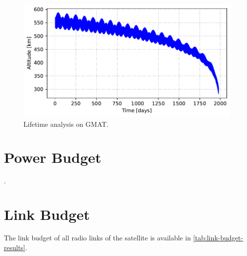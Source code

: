 \begin{figure}[!ht]
    \begin{center}
        \includegraphics[width=\textwidth]{curves/lifetime.pdf}
        \caption{Lifetime analysis on GMAT.}
        \label{fig:lifetime-analysis}
    \end{center}
\end{figure}

\section{Power Budget}

.

\section{Link Budget}

The link budget of all radio links of the satellite is available in \autoref{tab:link-budget-results}.

